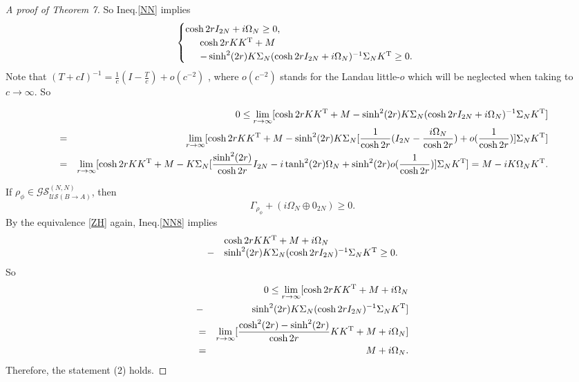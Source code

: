 \documentclass[10pt,aps,pra,amsfonts,amssymb,amsmath,%
floatfix,nofootinbib, groupedaddress,superscriptaddress,citesort,twocolumn
]{revtex4}%
\begin{document}
\begin{proof}[A proof of Theorem 7]
	So Ineq.\eqref{NN} implies
	$$\begin{cases}\label{66}
		\cosh2rI_{2N} + i{\Omega _{N}}\ge 0,\\	
		\begin{array}{rl}
			&\cosh2r K{K^{\rm T}} + M \\
			&- \sinh^2(2r) K\Sigma_N (\cosh2r I_{2N} + i\Omega _{N} )^{-1}\Sigma_N {K^{\rm T}} \ge 0.\end{array}\end{cases}$$
	Note that  $(T+cI)^{-1}=\frac{1}{c}(I-\frac{T}{c})+o(c^{-2})$ \cite{S1}, where  $o(c^{-2})$ stands for the Landau little-$o$  which will be neglected when taking to  $c \to \infty $. So
	\begin{widetext}
		\begin{eqnarray*}
			&&0\leq \mathop {\lim }\limits_{r \to \infty } [\cosh2r K{K^{\rm T}}  + M - \sinh^2(2r) K\Sigma_N ( \cosh2r I_{2N} + i{\Omega _N} )^{ - 1}\Sigma_N K^{\rm T}]\\
			&=& \mathop {\lim }\limits_{r \to \infty } [\cosh2rK{K^{\rm T}}  + M - \sinh^2(2r) K\Sigma_N[\frac{1}{\cosh2r}( I_{2N} -\frac{i\Omega _N}{\cosh2r})+o(\frac{1}{\cosh2r})]\Sigma_N{K^{\rm T}} ]\\
			&=& \mathop {\lim }\limits_{r \to \infty } [\cosh2r K{K^{\rm T}} + M - K\Sigma_N[\frac{\sinh^2(2r)}{\cosh2r}I_{2N} - i\tanh^2(2r){\Omega _N} +\sinh^2(2r)o(\frac{1}{\cosh2r})]\Sigma_N K^{\rm T} ]= M -i K{\Omega _N}{K^{\rm T}}.
		\end{eqnarray*}	
	\end{widetext}
 If  $ {\rho _\phi } \in {\mathcal {GS}}^{(N,N)}_{\mathcal {US}(B \rightarrow A)}$,
then
 \begin{equation}\label{NN8}
 	\Gamma _{{\rho _\phi }} + (i\Omega_{N}  \oplus 0_{2N} ) \ge 0.
 \end{equation}	
By  the equivalence \eqref{ZH} again, Ineq.\eqref{NN8} implies
$$\begin{array}{rl}
	&\cosh2r K{K^{\rm T}} + M+ i\Omega _{N}\\
	- &\sinh^2(2r) K\Sigma_N (\cosh2r I_{2N})^{-1}\Sigma_N {K^{\rm T}} \ge 0.\end{array}$$
So
	\begin{eqnarray*}
	&&0\leq \mathop {\lim }\limits_{r \to \infty } [\cosh2r K{K^{\rm T}} + M+ i\Omega _{N}\\
	&-&\sinh^2(2r) K\Sigma_N (\cosh2r I_{2N})^{-1}\Sigma_N {K^{\rm T}}]\\
	&=& \mathop {\lim }\limits_{r \to \infty } [\frac{\cosh^2(2r) -\sinh^2(2r)}{\cosh2r}K{K^{\rm T} }+ M + i\Omega _{N}] \\
	&=& M +i{\Omega _N}.
\end{eqnarray*}	
Therefore, the statement  (2) holds.


\end{proof}
\end{document}
